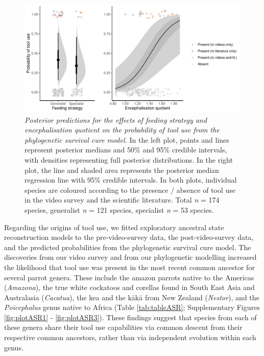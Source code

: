 \documentclass[
  man,floatsintext]{apa6}
\begin{document}
\begin{figure}
\centering
\includegraphics{manuscript_files/figure-latex/plotSurvCure4-1.pdf}
\caption{\label{fig:plotSurvCure4}\emph{Posterior predictions for the effects of feeding strategy and encephalisation quotient on the probability of tool use from the phylogenetic survival cure model.} In the left plot, points and lines represent posterior medians and 50\% and 95\% credible intervals, with densities representing full posterior distributions. In the right plot, the line and shaded area represents the posterior median regression line with 95\% credible intervals. In both plots, individual species are coloured according to the presence / absence of tool use in the video survey and the scientific literature. Total \emph{n} = 174 species, generalist \emph{n} = 121 species, specialist \emph{n} = 53 species.}
\end{figure}

Regarding the origins of tool use, we fitted exploratory ancestral state reconstruction models to the pre-video-survey data, the post-video-survey data, and the predicted probabilities from the phylogenetic survival cure model. The discoveries from our video survey and from our phylogenetic modelling increased the likelihood that tool use was present in the most recent common ancestor for several parrot genera. These include the amazon parrots native to the Americas (\emph{Amazona}), the true white cockatoos and corellas found in South East Asia and Australasia (\emph{Cacatua}), the kea and the kākā from New Zealand (\emph{Nestor}), and the \emph{Poicephalus} genus native to Africa (Table \ref{tab:tableASR}; Supplementary Figures \ref{fig:plotASR1} - \ref{fig:plotASR3}). These findings suggest that species from each of these genera share their tool use capabilities via common descent from their respective common ancestors, rather than via independent evolution within each genus.
\end{document}
